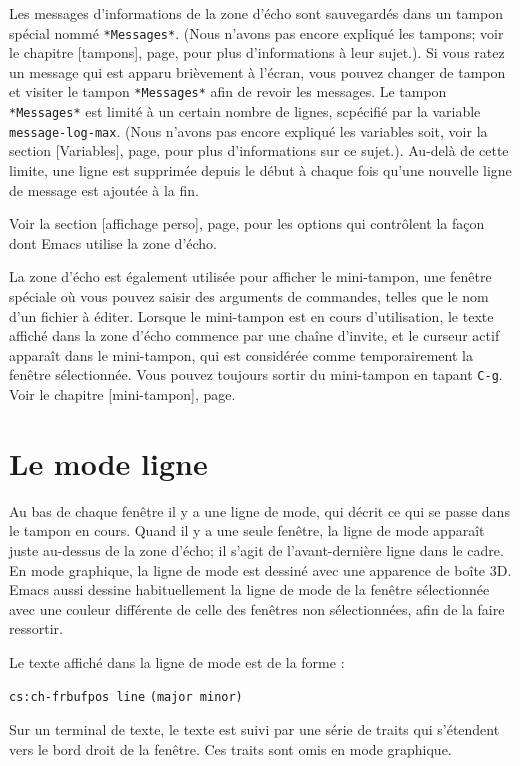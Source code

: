 Les messages d'informations de la zone d'écho sont sauvegardés dans un
tampon spécial nommé \texttt{*Messages*}. (Nous n'avons pas encore
expliqué les tampons; voir le chapitre [tampons],
page, pour plus d'informations à leur sujet.). Si
vous ratez un message qui est apparu brièvement à l'écran, vous pouvez
changer de tampon et visiter le tampon \texttt{*Messages*} afin de revoir les
messages. Le tampon \texttt{*Messages*} est limité à un certain nombre
de lignes, scpécifié par la variable \texttt{message-log-max}. (Nous
n'avons pas encore expliqué les variables soit, voir la
section [Variables], page, pour
plus d'informations sur ce sujet.). Au-delà de cette limite, une ligne
est supprimée depuis le début à chaque fois qu'une nouvelle ligne de
message est ajoutée à la fin.\par 

Voir la section [affichage perso],
page, pour les options qui contrôlent la façon
dont Emacs utilise la zone d'écho.\par

La zone d'écho est également utilisée pour afficher le mini-tampon,
une fenêtre spéciale où vous pouvez saisir des arguments de commandes,
telles que le nom d'un fichier à éditer. Lorsque le mini-tampon est en
cours d'utilisation, le texte affiché dans la zone d'écho commence par
une chaîne d'invite, et le curseur actif apparaît dans le mini-tampon,
qui est considérée comme temporairement la fenêtre sélectionnée. Vous
pouvez toujours sortir du mini-tampon en tapant \texttt{C-g}. Voir le
chapitre [mini-tampon], page. \par 


\section{Le mode ligne}
Au bas de chaque fenêtre il y a une ligne de mode, qui décrit ce qui
se passe dans le tampon en cours. Quand il y a une seule fenêtre, la
ligne de mode apparaît juste au-dessus de la zone d'écho; il s'agit de
l'avant-dernière ligne dans le cadre. En mode graphique, la ligne de
mode est dessiné avec une apparence de boîte 3D. Emacs aussi dessine
habituellement la ligne de mode de la fenêtre sélectionnée avec une
couleur différente de celle des fenêtres non sélectionnées, afin de la
faire ressortir.\par

Le texte affiché dans la ligne de mode est de la forme :
\begin{center}
  \texttt{cs:ch-fr}\quad \texttt{buf}\qquad \texttt{pos line}\quad
  \texttt{(major minor)}
\end{center}
Sur un terminal de texte, le texte est suivi par une série de traits
qui s'étendent vers le bord droit de la fenêtre. Ces traits sont omis
en mode graphique.\par

